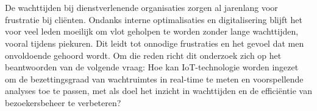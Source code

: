 
%
%
%
%
%

%



\chapter*{}

De wachttijden bij dienstverlenende organisaties zorgen al jarenlang voor frustratie bij cliënten. Ondanks interne optimalisaties en digitalisering blijft het voor veel leden moeilijk om vlot geholpen te worden zonder lange wachttijden, vooral tijdens piekuren. Dit leidt tot onnodige frustraties en het gevoel dat men onvoldoende gehoord wordt. Om die reden richt dit onderzoek zich op het beantwoorden van de volgende vraag: Hoe kan IoT-technologie worden ingezet om de bezettingsgraad van wachtruimtes in real-time te meten en voorspellende analyses toe te passen, met als doel het inzicht in wachttijden en de efficiëntie van bezoekersbeheer te verbeteren? \\


